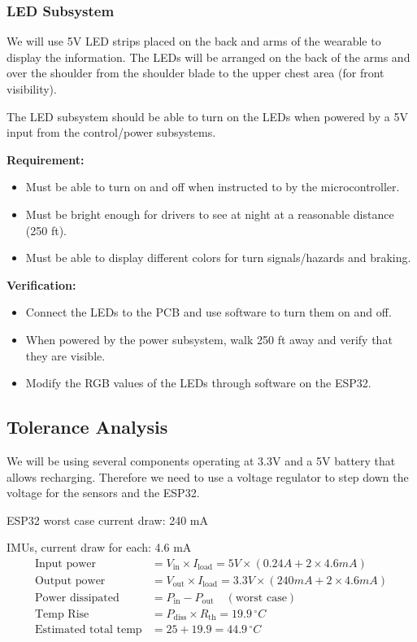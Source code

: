\documentclass[12pt]{article}
\begin{document}
    \subsubsection{LED Subsystem} 
    We will use 5V LED strips placed on the back and arms of the 
    wearable to display the information. The LEDs will be arranged 
    on the back of the arms and over the shoulder from the 
    shoulder blade to the upper chest area (for front visibility). 
    
    The LED subsystem should be able to turn on the LEDs when powered by a 5V input from the control/power subsystems.

    \textbf{Requirement:} 
    \begin{itemize}
        \item Must be able to turn on and off when instructed to by the microcontroller.
        \item Must be bright enough for drivers to see at night at a reasonable distance (250 ft).
        \item Must be able to display different colors for turn signals/hazards and braking.
    \end{itemize}

    \textbf{Verification:}
    \begin{itemize}
        \item Connect the LEDs to the PCB and use software to turn them on and off.
        \item When powered by the power subsystem, walk 250 ft away and verify that they are visible.
        \item Modify the RGB values of the LEDs through software on the ESP32.
    \end{itemize}

\subsection{Tolerance Analysis}
We will be using several components operating at 3.3V and a 5V 
battery that allows recharging. Therefore we need to use a 
voltage regulator to step down the voltage for the sensors 
and the ESP32. 

\noindent ESP32 worst case current draw: 240 mA

 IMUs, current draw for each: 4.6 mA
\begin{align*}
    \text{Input power} &= V_{\text{in}} \times I_{\text{load}} = 5V \times (0.24A + 2 \times 4.6mA) \\
    \text{Output power} &= V_{\text{out}} \times I_{\text{load}} = 3.3V \times (240mA + 2 \times 4.6mA) \\
    \text{Power dissipated} &= P_{\text{in}} - P_{\text{out}} \quad (\text{worst case}) \\
    \text{Temp Rise} &= P_{\text{diss}} \times R_{\text{th}} = 19.9 \, ^{\circ}C \\
    \text{Estimated total temp} &= 25 + 19.9 = 44.9 \, ^{\circ}C
\end{align*}
\end{document}
